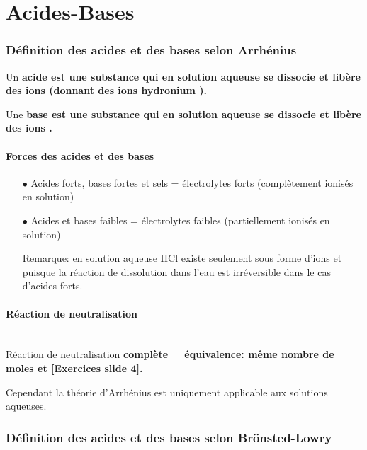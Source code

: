 \documentclass[11pt,a4paper,french]{article}
\renewcommand{\textbf}[1]{\begingroup\bfseries\mathversion{bold}#1\endgroup}
\begin{document}
\part{Acides-Bases}
\section{Définition des acides et des bases selon Arrhénius}

Un \textbf{acide} est une substance qui en solution aqueuse se dissocie et libère des ions  (donnant des ions hydronium ).

Une \textbf{base} est une substance qui en solution aqueuse se dissocie et libère des ions .

\subsection{Forces des acides et des bases}

\begin{itemize}
\item[$\bullet$] Acides forts, bases fortes et sels = électrolytes forts (complètement ionisés en solution)

\item[$\bullet$] Acides et bases faibles = électrolytes faibles (partiellement ionisés en solution)

Remarque: en solution aqueuse HCl existe seulement sous forme d'ions  et  puisque la réaction de dissolution dans l'eau est irréversible dans le cas d'acides forts.
\end{itemize}

\subsection{Réaction de neutralisation}

\\

Réaction de neutralisation \textbf{complète} = équivalence: même nombre de moles  et  [Exercices slide 4].

Cependant la théorie d'Arrhénius est uniquement applicable aux solutions aqueuses.

\section{Définition des acides et des bases selon Brönsted-Lowry}
\end{document}
